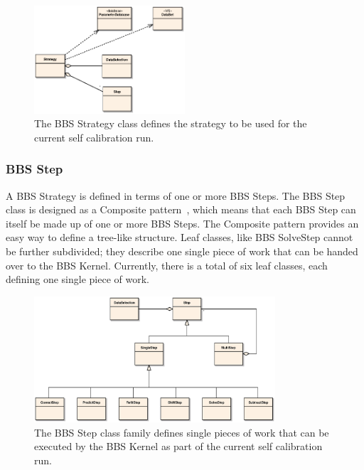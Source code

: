 \documentclass[10pt]{lofar}
\begin{document}
\begin{figure}[!ht]
\centering
\includegraphics[width=0.5\textwidth]{images/bbs-strategy-class-diagram}
\caption{The BBS Strategy class defines the strategy to be used for the current self calibration run.}
\label{fig:bbsstrategy}
\end{figure}

\subsubsection{BBS Step}
\label{subsubsec:design-step}
A BBS Strategy is defined in terms of one or more BBS Steps. The BBS Step
class is designed as a Composite pattern~\cite{Gamma1995}, which means that
each BBS Step can itself be made up of one or more BBS Steps. The Composite
pattern provides an easy way to define a tree-like structure. Leaf classes,
like BBS SolveStep cannot be further subdivided; they describe one single
piece of work that can be handed over to the BBS Kernel. Currently, there is a
total of six leaf classes, each defining one single piece of work.

\begin{figure}[!ht]
\centering
\includegraphics[width=0.8\textwidth]{images/bbs-step-class-diagram}
\caption{The BBS Step class family defines single pieces of work that can be
executed by the BBS Kernel as part of the current self calibration run.}
\label{fig:bbsstep}
\end{figure}
\end{document}
